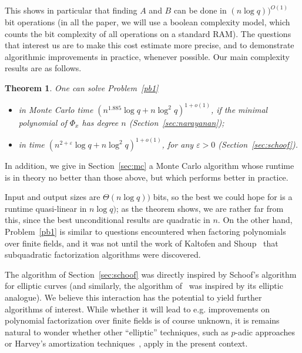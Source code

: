 \documentclass[sigconf]{acmart}
\newtheorem{theorem}{Theorem}
\begin{document}
This shows in particular that finding $A$ and $B$ can be done in $(n
\log q))^{O(1)}$ bit operations (in all the paper, we will use a
boolean complexity model, which counts the bit complexity of all
operations on a standard RAM). The questions that interest us are to
make this cost estimate more precise, and to demonstrate algorithmic
improvements in practice, whenever possible. Our main complexity
results are as follows.

\begin{theorem}\label{theo:main}
One can solve Problem~\ref{pb1}
\begin{itemize}
\item in Monte Carlo time $(n^{1.885} \log q + n \log^2 q)^{1+o(1)}$,
  if the minimal polynomial of $\Phi_x$ has degree $n$ (Section~\ref{sec:narayanan});
\item in time $(n^{2+\varepsilon} \log q + n \log^2 q)^{1+o(1)}$, for
  any $\varepsilon > 0$ (Section~\ref{sec:schoof}).
\end{itemize}
\end{theorem}
In addition, we give in Section~\ref{sec:mc} a Monte Carlo algorithm
whose runtime is in theory no better than those above, but which performs
better in practice.

Input and output sizes are $\Theta(n \log q))$ bits, so the best we
could hope for is a runtime quasi-linear in $n \log q)$; as the
theorem shows, we are rather far from this, since the best
unconditional results are quadratic in $n$. On the other hand,
Problem~\ref{pb1} is similar to questions encountered when factoring
polynomials over finite fields, and it was not until the work of
Kaltofen and Shoup~\cite{KaSh98} that subquadratic factorization
algorithms were discovered. 

The algorithm of Section~\ref{sec:schoof} was directly inspired by
Schoof's algorithm for elliptic curves (and similarly, the algorithm
of~\cite{eschost2017arXiv171200669D} was inspired by its elliptic
analogue). We believe this interaction has the potential to yield
further algorithms of interest. While whether it will lead to
e.g. improvements on polynomial factorization over finite fields is of
course unknown, it is remains natural to wonder whether other
``elliptic'' techniques, such as $p$-adic approaches~\cite{Satoh00} or
Harvey's amortization techniques~\cite{Harvey14}, apply in the present
context.

\end{document}
